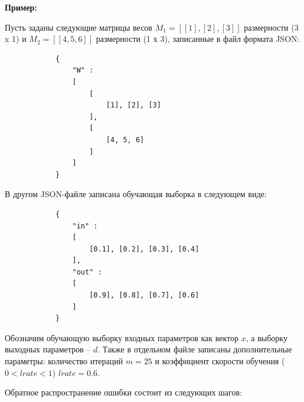 \documentclass[bachelor, och, otchet]{template}
\begin{document}
    \textbf{Пример:}

        Пусть заданы следующие матрицы весов $M_1 = [[1], [2], [3]]$ размерности (3 x 1)
        и $M_2 = [[4, 5, 6]]$ размерности (1 х 3), записанные в файл формата JSON:
        
        \begin{verbatim}
            {
                "W" : 
                [
                    [
                        [1], [2], [3]
                    ], 
                    [
                        [4, 5, 6]
                    ]
                ]
            }
        \end{verbatim}
    
        В другом JSON-файле записана обучающая выборка в следующем виде:
        
        \begin{verbatim}
            { 
                "in" : 
                [
                    [0.1], [0.2], [0.3], [0.4]
                ], 
                "out" : 
                [
                    [0.9], [0.8], [0.7], [0.6]
                ] 
            }
        \end{verbatim}

        Обозначим обучающую выборку входных параметров как вектор $x$, а выборку выходных параметров -- $d$.
        Также в отдельном файле записаны дополнительные параметры: количество итераций $m = 25$ и коэффициент
        скорости обучения ($0 < lrate < 1$)  $lrate = 0.6$.

        Обратное распространение ошибки состоит из следующих шагов:
\end{document}
